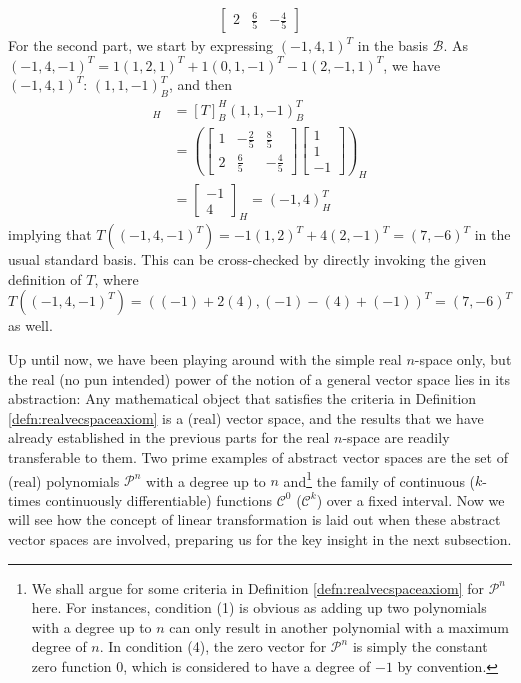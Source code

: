 \begin{solution}
\begin{align*}
\begin{bmatrix}
2 & \frac{6}{5} & -\frac{4}{5}
\end{bmatrix}
\end{align*}
For the second part, we start by expressing $(-1,4,1)^T$ in the basis $\mathcal{B}$. As $(-1,4,-1)^T = 1(1,2,1)^T + 1(0,1,-1)^T - 1(2,-1,1)^T$, we have $(-1,4,1)^T$: $(1,1,-1)_B^T$, and then
\begin{align*}
[T((1,1,-1)_B^T)]_H &= [T]_B^H (1,1,-1)_B^T \\
&=
\left(\begin{bmatrix}
1 & -\frac{2}{5} & \frac{8}{5} \\
2 & \frac{6}{5} & -\frac{4}{5}
\end{bmatrix}
\begin{bmatrix}
1 \\
1 \\
-1
\end{bmatrix}\right)_H \\
&=
\begin{bmatrix}
-1 \\
4
\end{bmatrix}_H = (-1,4)^T_H
\end{align*}
implying that $T((-1,4,-1)^T) = -1(1,2)^T + 4(2,-1)^T = (7,-6)^T$ in the usual standard basis. This can be cross-checked by directly invoking the given definition of $T$, where $T((-1,4,-1)^T) = ((-1)+2(4), (-1)-(4)+(-1))^T = (7,-6)^T$ as well.
\end{solution}

Up until now, we have been playing around with the simple real $n$-space only, but the real (no pun intended) power of the notion of a general vector space lies in its abstraction: Any mathematical object that satisfies the criteria in Definition \ref{defn:realvecspaceaxiom} is a (real) vector space, and the results that we have already established in the previous parts for the real $n$-space are readily transferable to them. Two prime examples of abstract vector spaces are the set of (real) polynomials $\mathcal{P}^n$ with a degree up to $n$ and\footnote{We shall argue for some criteria in Definition \ref{defn:realvecspaceaxiom} for $\mathcal{P}^n$ here. For instances, condition (1) is obvious as adding up two polynomials with a degree up to $n$ can only result in another polynomial with a maximum degree of $n$. In condition (4), the zero vector for $\mathcal{P}^n$ is simply the constant zero function $0$, which is considered to have a degree of $-1$ by convention.} the family of continuous ($k$-times continuously differentiable) functions $\mathcal{C}^0$ ($\mathcal{C}^k$) over a fixed interval. Now we will see how the concept of linear transformation is laid out when these abstract vector spaces are involved, preparing us for the key insight in the next subsection.


